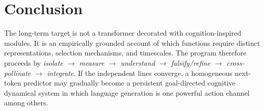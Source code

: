 \documentclass[11pt]{article}
\begin{document}
\section{Conclusion}
The long-term target is not a transformer decorated with cognition-inspired modules. It is an empirically grounded account of which functions require distinct representations, selection mechanisms, and timescales. The program therefore proceeds by \emph{isolate $\rightarrow$ measure $\rightarrow$ understand $\rightarrow$ falsify/refine $\rightarrow$ cross-pollinate $\rightarrow$ integrate}. If the independent lines converge, a homogeneous next-token predictor may gradually become a persistent goal-directed cognitive dynamical system in which language generation is one powerful action channel among others.


\end{document}
